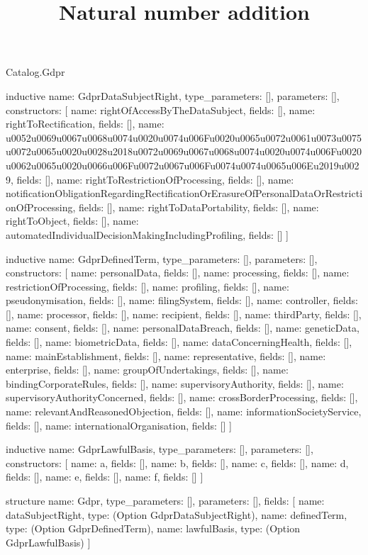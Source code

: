 \begin{lexlean}{Catalog.Gdpr}
\title{Natural number addition}
\begin{semanticmodule}
inductive{
  name: GdprDataSubjectRight,
  type_parameters: [],
  parameters: [],
  constructors: [
    {name: rightOfAccessByTheDataSubject, fields: []},
    {name: rightToRectification, fields: []},
    {name: u0052u0069u0067u0068u0074u0020u0074u006Fu0020u0065u0072u0061u0073u0075u0072u0065u0020u0028u2018u0072u0069u0067u0068u0074u0020u0074u006Fu0020u0062u0065u0020u0066u006Fu0072u0067u006Fu0074u0074u0065u006Eu2019u0029, fields: []},
    {name: rightToRestrictionOfProcessing, fields: []},
    {name: notificationObligationRegardingRectificationOrErasureOfPersonalDataOrRestrictionOfProcessing, fields: []},
    {name: rightToDataPortability, fields: []},
    {name: rightToObject, fields: []},
    {name: automatedIndividualDecisionMakingIncludingProfiling, fields: []}
  ]
}

inductive{
  name: GdprDefinedTerm,
  type_parameters: [],
  parameters: [],
  constructors: [
    {name: personalData, fields: []},
    {name: processing, fields: []},
    {name: restrictionOfProcessing, fields: []},
    {name: profiling, fields: []},
    {name: pseudonymisation, fields: []},
    {name: filingSystem, fields: []},
    {name: controller, fields: []},
    {name: processor, fields: []},
    {name: recipient, fields: []},
    {name: thirdParty, fields: []},
    {name: consent, fields: []},
    {name: personalDataBreach, fields: []},
    {name: geneticData, fields: []},
    {name: biometricData, fields: []},
    {name: dataConcerningHealth, fields: []},
    {name: mainEstablishment, fields: []},
    {name: representative, fields: []},
    {name: enterprise, fields: []},
    {name: groupOfUndertakings, fields: []},
    {name: bindingCorporateRules, fields: []},
    {name: supervisoryAuthority, fields: []},
    {name: supervisoryAuthorityConcerned, fields: []},
    {name: crossBorderProcessing, fields: []},
    {name: relevantAndReasonedObjection, fields: []},
    {name: informationSocietyService, fields: []},
    {name: internationalOrganisation, fields: []}
  ]
}

inductive{
  name: GdprLawfulBasis,
  type_parameters: [],
  parameters: [],
  constructors: [
    {name: a, fields: []},
    {name: b, fields: []},
    {name: c, fields: []},
    {name: d, fields: []},
    {name: e, fields: []},
    {name: f, fields: []}
  ]
}

structure{
  name: Gdpr,
  type_parameters: [],
  parameters: [],
  fields: [
    {name: dataSubjectRight, type: (Option GdprDataSubjectRight)},
    {name: definedTerm, type: (Option GdprDefinedTerm)},
    {name: lawfulBasis, type: (Option GdprLawfulBasis)}
  ]
}
\end{semanticmodule}
\end{lexlean}

